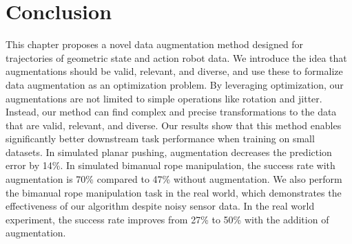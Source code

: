 \section{Conclusion}  \label{RSS:sec:conclusion}

This chapter proposes a novel data augmentation method designed for trajectories of geometric state and action robot data. We introduce the idea that augmentations should be valid, relevant, and diverse, and use these to formalize data augmentation as an optimization problem. By leveraging optimization, our augmentations are not limited to simple operations like rotation and jitter. Instead, our method can find complex and precise transformations to the data that are valid, relevant, and diverse. Our results show that this method enables significantly better downstream task performance when training on small datasets. In simulated planar pushing, augmentation decreases the prediction error by 14\%. In simulated bimanual rope manipulation, the success rate with augmentation is 70\% compared to 47\% without augmentation. We also perform the bimanual rope manipulation task in the real world, which demonstrates the effectiveness of our algorithm despite noisy sensor data. In the real world experiment, the success rate improves from 27\% to 50\% with the addition of augmentation.
